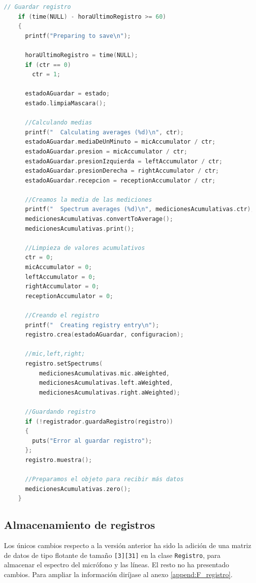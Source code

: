 \begin{lstlisting}[language=c++, label={lst:lms9-registrador}, caption={Generación de registros en el \acrshort{LM9}.}]
	// Guardar registro
    if (time(NULL) - horaUltimoRegistro >= 60)
    {
      printf("Preparing to save\n");

      horaUltimoRegistro = time(NULL);
      if (ctr == 0)
        ctr = 1;

      estadoAGuardar = estado;
      estado.limpiaMascara();

      //Calculando medias
      printf("  Calculating averages (%d)\n", ctr);
      estadoAGuardar.mediaDeUnMinuto = micAccumulator / ctr;
      estadoAGuardar.presion = micAccumulator / ctr;
      estadoAGuardar.presionIzquierda = leftAccumulator / ctr;
      estadoAGuardar.presionDerecha = rightAccumulator / ctr;
      estadoAGuardar.recepcion = receptionAccumulator / ctr;

      //Creamos la media de las mediciones
      printf("  Spectrum averages (%d)\n", medicionesAcumulativas.ctr);
      medicionesAcumulativas.convertToAverage();
      medicionesAcumulativas.print();

      //Limpieza de valores acumulativos
      ctr = 0;
      micAccumulator = 0;
      leftAccumulator = 0;
      rightAccumulator = 0;
      receptionAccumulator = 0;

      //Creando el registro
      printf("  Creating registry entry\n");
      registro.crea(estadoAGuardar, configuracion);

      //mic,left,right;
      registro.setSpectrums(
          medicionesAcumulativas.mic.aWeighted,
          medicionesAcumulativas.left.aWeighted,
          medicionesAcumulativas.right.aWeighted);

      //Guardando registro
      if (!registrador.guardaRegistro(registro))
      {
        puts("Error al guardar registro");
      };
      registro.muestra();

      //Preparamos el objeto para recibir más datos
      medicionesAcumulativas.zero();
    }
\end{lstlisting}


\subsection{Almacenamiento de registros}

Los únicos cambios respecto a la versión anterior ha sido la adición de una matriz de datos de tipo flotante de tamaño \texttt{[3][31]} en la clase \verb|Registro|, para almacenar el espectro del micrófono y las líneas. El resto no ha presentado cambios. Para ampliar la información diríjase al anexo \ref{append:F_registro}.

